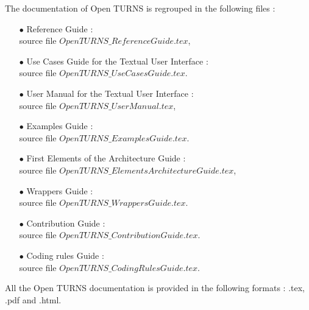 \documentclass[11pt]{article}
\begin{document}
The documentation of Open TURNS is regrouped in the following files :
\begin{itemize}
\item[$\bullet$] Reference Guide : \\
  source file $OpenTURNS\_ReferenceGuide.tex$,
\item[$\bullet$] Use Cases Guide for the Textual User Interface : \\
  source file $OpenTURNS\_UseCasesGuide.tex$.
\item[$\bullet$] User Manual for the Textual User Interface : \\
  source file $OpenTURNS\_UserManual.tex$,
\item[$\bullet$] Examples Guide : \\
  source file $OpenTURNS\_ExamplesGuide.tex$.
\item[$\bullet$] First Elements of the Architecture Guide : \\
  source file $OpenTURNS\_ElementsArchitectureGuide.tex$,
\item[$\bullet$] Wrappers Guide : \\
  source file $OpenTURNS\_WrappersGuide.tex$.
\item[$\bullet$] Contribution Guide : \\
  source file $OpenTURNS\_ContributionGuide.tex$.
\item[$\bullet$] Coding rules Guide : \\
  source file $OpenTURNS\_CodingRulesGuide.tex$.
\end{itemize}
\vspace*{0.5cm}
All the Open TURNS documentation is provided in the following formats : .tex, .pdf and  .html.
\end{document}
